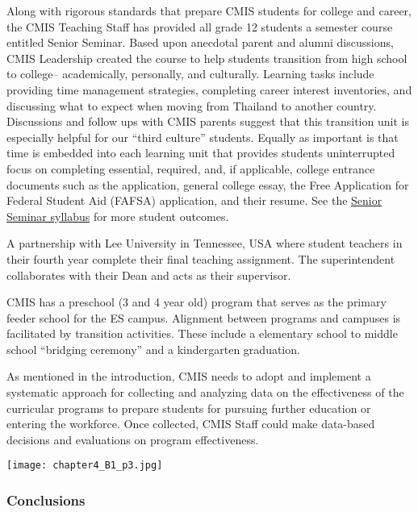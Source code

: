 \begin{findings}
Along with rigorous standards that prepare CMIS students for college and career, the CMIS Teaching Staff has provided all grade 12 students a semester course entitled Senior Seminar. Based upon anecdotal parent and alumni discussions, CMIS Leadership created the course to help students transition from high school to college-- academically, personally, and culturally. Learning tasks include providing time management strategies, completing career interest inventories, and discussing what to expect when moving from Thailand to another country. Discussions and follow ups with CMIS parents suggest that this transition unit is especially helpful for our “third culture” students. Equally as important is that time is embedded into each learning unit that provides students uninterrupted focus on completing essential, required, and, if applicable, college entrance documents such as the application, general college essay, the Free Application for Federal Student Aid (FAFSA) application, and their resume. See the \href{https://docs.google.com/document/d/18kR5KtmfaH0cXUem7C2YUkeOWLfFMl_x3ekP-plvyRk/edit}{Senior Seminar syllabus} for more student outcomes. 


A partnership with Lee University in Tennessee, USA where student teachers in their fourth year complete their final teaching assignment. The superintendent collaborates with their Dean and acts as their supervisor.

CMIS has a preschool (3 and 4 year old) program that serves as the primary feeder school for the ES campus.  Alignment between programs and campuses is facilitated by transition activities. These include a elementary school to middle school “bridging ceremony” and a kindergarten graduation.


As mentioned in the introduction, CMIS needs to adopt and implement a systematic approach for collecting and analyzing data on the effectiveness of the curricular programs to prepare students for pursuing further education or entering the workforce. Once collected, CMIS Staff could make data-based decisions and evaluations on program effectiveness. 
\end{findings}


{\centering\texttt{[image: chapter4\_B1\_p3.jpg]}}


\subsubsection{Conclusions}

